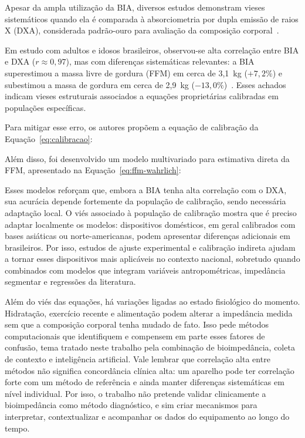 Apesar da ampla utilização da BIA, diversos estudos demonstram vieses sistemáticos
quando ela é comparada à absorciometria por dupla emissão de raios X (DXA), considerada
padrão-ouro para avaliação da composição corporal~\cite{heymsfield2005}.

Em estudo com adultos e idosos brasileiros, observou-se alta correlação entre BIA e DXA
($r \approx 0{,}97$), mas com diferenças sistemáticas relevantes: a BIA superestimou a
massa livre de gordura (FFM) em cerca de 3,1~kg ($+7{,}2\%$) e subestimou a massa de
gordura em cerca de 2,9~kg ($-13{,}0\%$)~\cite{wahrlich2026}. Esses achados indicam vieses
estruturais associados a equações proprietárias calibradas em populações específicas.

Para mitigar esse erro, os autores propõem a equação de calibração da
Equação~\ref{eq:calibracao}:


Além disso, foi desenvolvido um modelo multivariado para estimativa direta da FFM,
apresentado na Equação~\ref{eq:ffm-wahrlich}:


Esses modelos reforçam que, embora a BIA tenha alta correlação com o DXA, sua acurácia
depende fortemente da população de calibração, sendo necessária adaptação local. O viés
associado à população de calibração mostra que é preciso adaptar localmente os modelos:
dispositivos domésticos, em geral calibrados com bases asiáticas ou norte-americanas,
podem apresentar diferenças adicionais em brasileiros. Por isso, estudos de ajuste
experimental e calibração indireta ajudam a tornar esses dispositivos mais aplicáveis no
contexto nacional, sobretudo quando combinados com modelos que integram variáveis
antropométricas, impedância segmentar e regressões da literatura.

Além do viés das equações, há variações ligadas ao estado fisiológico do momento.
Hidratação, exercício recente e alimentação podem alterar a impedância medida sem que a
composição corporal tenha mudado de fato. Isso pede métodos computacionais que
identifiquem e compensem em parte esses fatores de confusão, tema tratado neste trabalho
pela combinação de bioimpedância, coleta de contexto e inteligência artificial. Vale
lembrar que correlação alta entre métodos não significa concordância clínica alta: um
aparelho pode ter correlação forte com um método de referência e ainda manter diferenças
sistemáticas em nível individual. Por isso, o trabalho não pretende validar clinicamente
a bioimpedância como método diagnóstico, e sim criar mecanismos para interpretar,
contextualizar e acompanhar os dados do equipamento ao longo do tempo.

